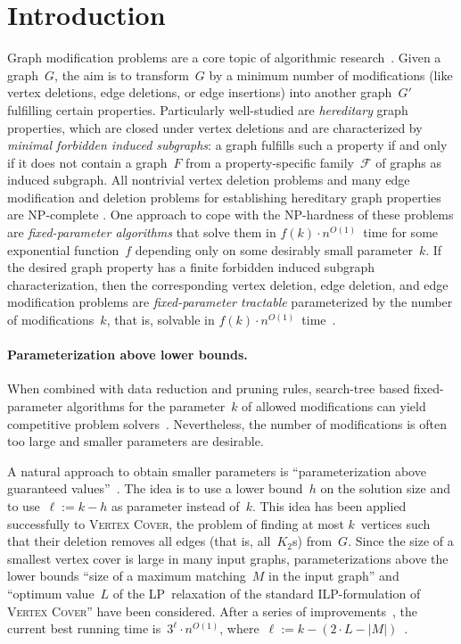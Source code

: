 \documentclass[envcountsame,numbook,smallextended]{svjour3}
\numberwithin{equation}{section}
\numberwithin{figure}{section}
\begin{document}
\section{Introduction}
Graph modification problems are a core topic
of algorithmic research~\cite{LY80,Cai96,Yan81}.
Given a graph~$G$,
the aim is to transform~$G$ by a minimum number of modifications
(like vertex deletions, edge deletions, or edge insertions)
into another graph~$G'$ fulfilling certain properties.
Particularly well-studied are \emph{hereditary} graph properties, which are closed under vertex deletions and are characterized by \emph{minimal forbidden induced subgraphs}: a graph fulfills such a property if and only if it does not contain a graph~$F$ from a property-specific family~$\mathcal{F}$ of graphs as induced subgraph.  All nontrivial vertex deletion problems and many edge modification and deletion problems for establishing hereditary graph properties are NP-complete
\cite{LY80,Alon06,MK86,Yan81,ASS16}.  One approach to cope with the NP-hardness of these problems are \emph{fixed-parameter algorithms} that solve them in \(f(k)\cdot n^{O(1)}\)~time for some exponential function~\(f\) depending only on some desirably small parameter~\(k\).   If the desired graph property has a finite forbidden induced subgraph characterization, then the corresponding vertex deletion, edge deletion, and edge modification problems are \emph{fixed-parameter tractable} parameterized by the number of modifications~$k$, that is, solvable in \(f(k)\cdot n^{O(1)}\)~time~\cite{Cai96}.

\paragraph{Parameterization above lower bounds.} When combined with data reduction and pruning rules, search-tree based fixed-parameter algorithms for the parameter~\(k\) of allowed modifications can yield competitive problem solvers~\cite{HH15,MNS12}.  Nevertheless, the number of modifications is often too large and smaller parameters are desirable.

A natural approach to obtain smaller parameters is ``parameterization above guaranteed values''~\cite{MR99,CPPW13,LNR+14,GP15}. The idea is to use a lower bound~$h$ on the solution size and to use~$\ell:=k-h$ as parameter instead of~$k$.
This idea has been applied successfully to \textsc{Vertex Cover}, the
problem of finding at most $k$~vertices such that
their deletion removes all edges (that is, all~$K_2$s) from~$G$. Since the size of a smallest vertex
cover is large in many input graphs, 
parameterizations above
the lower bounds ``size of a maximum
matching~$M$ in the input graph'' and ``optimum value~$L$ of the LP~relaxation of the standard ILP-formulation of \textsc{Vertex Cover}''
have been considered.
After a series of
improvements~\cite{RO09,CPPW13,LNR+14,GP15}, the current best running time
is~$3^{\ell}\cdot n^{O(1)}$, where~$\ell:=k-(2\cdot L-|M|)$~\cite{GP15}.
\end{document}
